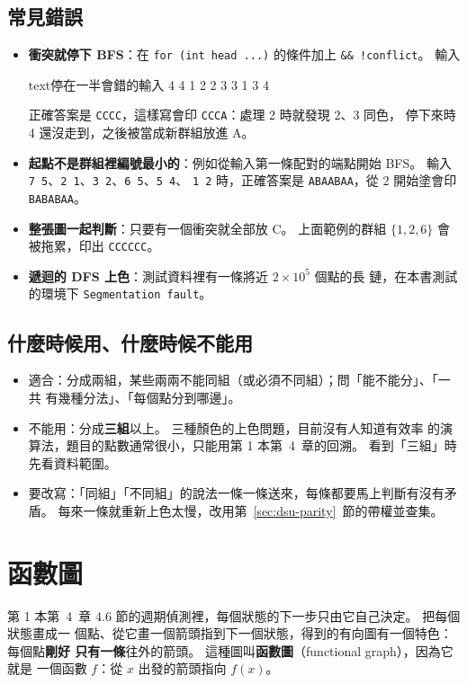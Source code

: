 \subsection{常見錯誤}

\begin{itemize}
\item \textbf{衝突就停下 BFS}：在 \texttt{for (int head ...)} 的條件加上
\texttt{\&\& !conflict}。 輸入
\begin{code}{text}{停在一半會錯的輸入}
4 4
1 2
2 3
3 1
3 4
\end{code}
正確答案是 \texttt{CCCC}，這樣寫會印 \texttt{CCCA}：處理 2 時就發現 2、3 同色，
停下來時 4 還沒走到，之後被當成新群組放進 A。
\item \textbf{起點不是群組裡編號最小的}：例如從輸入第一條配對的端點開始 BFS。
輸入 \texttt{7 5}、\texttt{2 1}、\texttt{3 2}、\texttt{6 5}、\texttt{5 4}、
\texttt{1 2} 時，正確答案是 \texttt{ABAABAA}，從 2 開始塗會印
\texttt{BABABAA}。
\item \textbf{整張圖一起判斷}：只要有一個衝突就全部放 C。 上面範例的群組
$\{1, 2, 6\}$ 會被拖累，印出 \texttt{CCCCCC}。
\item \textbf{遞迴的 DFS 上色}：測試資料裡有一條將近 $2 \times 10^5$ 個點的長
鏈，在本書測試的環境下 \texttt{Segmentation fault}。
\end{itemize}

\subsection{什麼時候用、什麼時候不能用}

\begin{itemize}
\item 適合：分成兩組，某些兩兩不能同組（或必須不同組）；問「能不能分」、「一共
有幾種分法」、「每個點分到哪邊」。
\item 不能用：分成\textbf{三組}以上。 三種顏色的上色問題，目前沒有人知道有效率
的演算法，題目的點數通常很小，只能用第 1 本第~4~章的回溯。 看到「三組」時先看資料範圍。
\item 要改寫：「同組」「不同組」的說法一條一條送來，每條都要馬上判斷有沒有矛盾。
每來一條就重新上色太慢，改用第~\ref{sec:dsu-parity}~節的帶權並查集。
\end{itemize}

\section{函數圖}
\label{sec:functional}

第 1 本第~4~章 4.6 節的週期偵測裡，每個狀態的下一步只由它自己決定。 把每個狀態畫成一
個點、從它畫一個箭頭指到下一個狀態，得到的有向圖有一個特色：每個點\textbf{剛好
只有一條}往外的箭頭。 這種圖叫\textbf{函數圖}（functional graph），因為它就是
一個函數 $f$：從 $x$ 出發的箭頭指向 $f(x)$。

